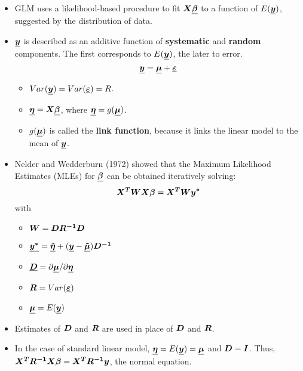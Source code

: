 \begin{frame}
  \begin{itemize}
    \vspace{0.5cm}
    \item GLM uses a likelihood-based procedure to fit $ \boldsymbol{X} \boldsymbol{\underline{\beta}} $ to a function of $ E(\boldsymbol{\underline{y}}) $, suggested by the distribution of data.
    \vspace{0.5cm}
    \item $ \boldsymbol{\underline{y}} $ is described as an additive function of \textbf{systematic} and \textbf{random} components. The first corresponds to $ E(\boldsymbol{\underline{y}}) $, the later to error.
      $$ \boldsymbol{\underline{y}} = \boldsymbol{\underline{\mu}} + \boldsymbol{\underline{\varepsilon}} $$
      \begin{itemize}
        \item $ Var(\boldsymbol{\underline{y}}) = Var(\boldsymbol{\underline{\varepsilon}}) = R $.
        \vspace{0.2cm}
        \item $ \boldsymbol{\underline{\eta}} = \boldsymbol{X} \boldsymbol{\underline{\beta}}$, where $ \boldsymbol{\underline{\eta}} = g(\boldsymbol{\underline{\mu}}) $.
        \vspace{0.2cm}
        \item $ g(\boldsymbol{\underline{\mu}}) $ is called the \textbf{link function}, because it links the linear model to the mean of $ \boldsymbol{\underline{y}} $.
      \end{itemize}
  \end{itemize}
\end{frame}

\begin{frame}
  \begin{itemize}
    \item Nelder and Wedderburn (1972) showed that the Maximum Likelihood Estimates (MLEs) for $ \boldsymbol{\underline{\beta}} $ can be obtained iteratively solving:
      $$ \boldsymbol{X^T} \boldsymbol{W} \boldsymbol{X} \boldsymbol{\beta} =  \boldsymbol{X^T} \boldsymbol{W} \boldsymbol{y^*} $$
      with
      \begin{itemize}
        \item $ \boldsymbol{W} = \boldsymbol{D} \boldsymbol{R^{-1}} \boldsymbol{D} $
        \item $ \boldsymbol{\underline{y^*}} = \boldsymbol{\underline{\hat{\eta}}} + (\boldsymbol{\underline{y}} - \boldsymbol{\underline{\tilde{\mu}}}) \boldsymbol{D^{-1}} $
        \item $ \boldsymbol{\underline{D}} = \partial \boldsymbol{\underline{\mu}} / \partial \boldsymbol{\underline{\eta}} $
        \item $ \boldsymbol{R} = Var(\boldsymbol{\underline{\varepsilon}}) $
        \item $ \boldsymbol{\underline{\mu}} = E(\boldsymbol{\underline{y}}) $
      \end{itemize}
    \vspace{0.25cm}
    \item Estimates of $ \boldsymbol{D} $ and $ \boldsymbol{R} $ are used in place of $ \boldsymbol{D} $ and $ \boldsymbol{R} $.
    \vspace{0.25cm}
    \item In the case of standard linear model, $ \boldsymbol{\underline{\eta}} = E(\boldsymbol{\underline{y}}) = \boldsymbol{\underline{\mu}} $ and $ \boldsymbol{D} = \boldsymbol{I} $. Thus, $ \boldsymbol{X^T} \boldsymbol{R^{-1}} \boldsymbol{X} \boldsymbol{\beta} =  \boldsymbol{X^T} \boldsymbol{R^{-1}} \boldsymbol{y} $, the normal equation.
  \end{itemize}
\end{frame}



